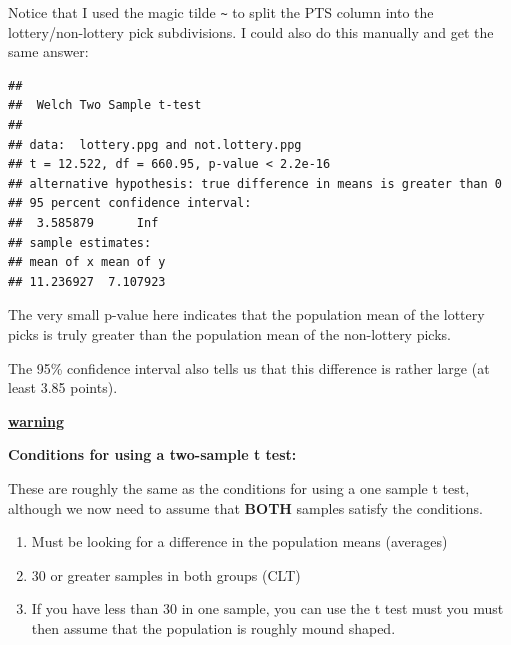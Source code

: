 \documentclass[
]{book}
\newenvironment{Shaded}{\begin{snugshade}}{\end{snugshade}}
\newcommand{\AttributeTok}[1]{\textcolor[rgb]{0.77,0.63,0.00}{#1}}
\newcommand{\FunctionTok}[1]{\textcolor[rgb]{0.00,0.00,0.00}{#1}}
\newcommand{\NormalTok}[1]{#1}
\newcommand{\OtherTok}[1]{\textcolor[rgb]{0.56,0.35,0.01}{#1}}
\newcommand{\SpecialCharTok}[1]{\textcolor[rgb]{0.00,0.00,0.00}{#1}}
\newcommand{\StringTok}[1]{\textcolor[rgb]{0.31,0.60,0.02}{#1}}
\newenvironment{rmdblock}[1]
  {\begin{shaded*}
  \centerline{\underline{\textbf{#1}}}

  }
  {
  \end{shaded*}
  }
\newenvironment{warning}
  {\begin{rmdblock}{warning}}
  {\end{rmdblock}}
\theoremstyle{definition}
\theoremstyle{definition}
\theoremstyle{definition}
\theoremstyle{definition}
\theoremstyle{remark}
\begin{document}
Notice that I used the magic tilde \texttt{\textasciitilde{}} to split the PTS column into the lottery/non-lottery pick subdivisions. I could also do this manually and get the same answer:

\begin{Shaded}
\end{Shaded}

\begin{verbatim}
## 
##  Welch Two Sample t-test
## 
## data:  lottery.ppg and not.lottery.ppg
## t = 12.522, df = 660.95, p-value < 2.2e-16
## alternative hypothesis: true difference in means is greater than 0
## 95 percent confidence interval:
##  3.585879      Inf
## sample estimates:
## mean of x mean of y 
## 11.236927  7.107923
\end{verbatim}

The very small p-value here indicates that the population mean of the lottery picks is truly greater than the population mean of the non-lottery picks.

The 95\% confidence interval also tells us that this difference is rather large (at least 3.85 points).

\begin{warning}
\textbf{Conditions for using a two-sample t test:}

These are roughly the same as the conditions for using a one sample t test, although we now need to assume that \textbf{BOTH} samples satisfy the conditions.

\begin{enumerate}
\def\labelenumi{\arabic{enumi}.}
\item
  Must be looking for a difference in the population means (averages)
\item
  30 or greater samples in both groups (CLT)
\item
  If you have less than 30 in one sample, you can use the t test must you must then assume that the population is roughly mound shaped.
\end{enumerate}
\end{warning}
\end{document}
